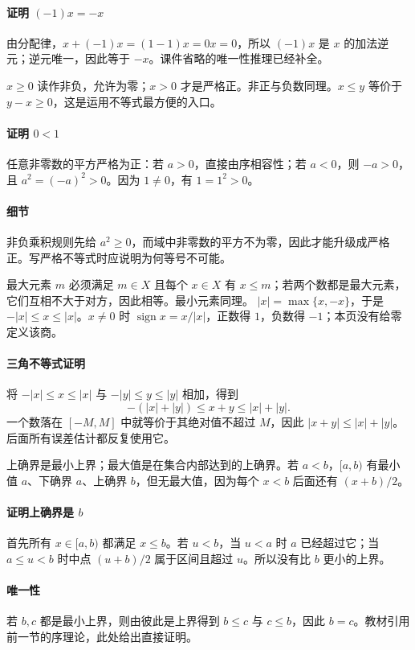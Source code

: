 \paragraph{证明 $(-1)x=-x$}由分配律，$x+(-1)x=(1-1)x=0x=0$，所以 $(-1)x$ 是 $x$ 的加法逆元；逆元唯一，因此等于 $-x$。课件省略的唯一性推理已经补全。

$x\ge0$ 读作非负，允许为零；$x>0$ 才是严格正。非正与负数同理。$x\le y$ 等价于 $y-x\ge0$，这是运用不等式最方便的入口。
\paragraph{证明 $0<1$}任意非零数的平方严格为正：若 $a>0$，直接由序相容性；若 $a<0$，则 $-a>0$，且 $a^2=(-a)^2>0$。因为 $1\ne0$，有 $1=1^2>0$。
\paragraph{细节}非负乘积规则先给 $a^2\ge0$，而域中非零数的平方不为零，因此才能升级成严格正。写严格不等式时应说明为何等号不可能。

最大元素 $m$ 必须满足 $m\in X$ 且每个 $x\in X$ 有 $x\le m$；若两个数都是最大元素，它们互相不大于对方，因此相等。最小元素同理。
$|x|=\max\{x,-x\}$，于是 $-|x|\le x\le|x|$。$x\ne0$ 时 $\operatorname{sign}x=x/|x|$，正数得 $1$，负数得 $-1$；本页没有给零定义该商。
\paragraph{三角不等式证明}将 $-|x|\le x\le|x|$ 与 $-|y|\le y\le|y|$ 相加，得到
\[-(|x|+|y|)\le x+y\le|x|+|y|.\]
一个数落在 $[-M,M]$ 中就等价于其绝对值不超过 $M$，因此 $|x+y|\le|x|+|y|$。后面所有误差估计都反复使用它。

上确界是最小上界；最大值是在集合内部达到的上确界。若 $a<b$，$[a,b)$ 有最小值 $a$、下确界 $a$、上确界 $b$，但无最大值，因为每个 $x<b$ 后面还有 $(x+b)/2$。
\paragraph{证明上确界是 $b$}首先所有 $x\in[a,b)$ 都满足 $x\le b$。若 $u<b$，当 $u<a$ 时 $a$ 已经超过它；当 $a\le u<b$ 时中点 $(u+b)/2$ 属于区间且超过 $u$。所以没有比 $b$ 更小的上界。
\paragraph{唯一性}若 $b,c$ 都是最小上界，则由彼此是上界得到 $b\le c$ 与 $c\le b$，因此 $b=c$。教材引用前一节的序理论，此处给出直接证明。

